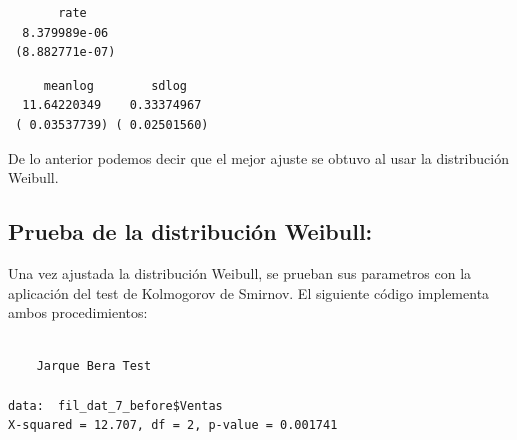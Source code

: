 \documentclass[
  us-letterpaper,
]{scrreprt}
\newenvironment{Shaded}{\begin{snugshade}}{\end{snugshade}}
\newcommand{\CommentTok}[1]{\textcolor[rgb]{0.37,0.37,0.37}{#1}}
\newcommand{\FunctionTok}[1]{\textcolor[rgb]{0.28,0.35,0.67}{#1}}
\newcommand{\NormalTok}[1]{\textcolor[rgb]{0.00,0.23,0.31}{#1}}
\newcommand{\OtherTok}[1]{\textcolor[rgb]{0.00,0.23,0.31}{#1}}
\newcommand{\SpecialCharTok}[1]{\textcolor[rgb]{0.37,0.37,0.37}{#1}}
\newcommand{\StringTok}[1]{\textcolor[rgb]{0.13,0.47,0.30}{#1}}
\theoremstyle{plain}
\theoremstyle{plain}
\theoremstyle{definition}
\theoremstyle{remark}
\begin{document}
\begin{verbatim}
       rate    
  8.379989e-06 
 (8.882771e-07)
\end{verbatim}

\begin{Shaded}
\end{Shaded}

\begin{verbatim}
     meanlog        sdlog   
  11.64220349    0.33374967 
 ( 0.03537739) ( 0.02501560)
\end{verbatim}

De lo anterior podemos decir que el mejor ajuste se obtuvo al usar la
distribución Weibull.

\subsection{Prueba de la distribución
Weibull:}\label{prueba-de-la-distribuciuxf3n-weibull}

Una vez ajustada la distribución Weibull, se prueban sus parametros con
la aplicación del test de Kolmogorov de Smirnov. El siguiente código
implementa ambos procedimientos:

\begin{Shaded}
\end{Shaded}

\begin{verbatim}

    Jarque Bera Test

data:  fil_dat_7_before$Ventas
X-squared = 12.707, df = 2, p-value = 0.001741
\end{verbatim}

\begin{Shaded}
\end{Shaded}
\end{document}
